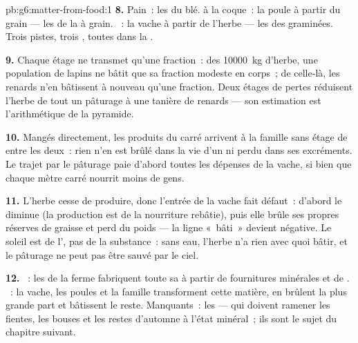 \begin{solution}{pb:g6:matter-from-food:1}
\textbf{8.} Pain~: les  du blé.  à la coque~: la poule à
partir du grain --- les  de la  à grain. ~: la
vache à partir de l'herbe --- les  des graminées. Trois
pistes, trois , toutes dans la .

\textbf{9.} Chaque étage ne transmet qu'une fraction~: des
\qty{10000}{kg} d'herbe, une population de lapins ne bâtit que sa
fraction modeste en corps~; de celle-là, les renards n'en bâtissent
à nouveau qu'une fraction. Deux étages de pertes réduisent
l'herbe de tout un pâturage à une tanière de renards --- son
estimation est l'arithmétique de la pyramide.

\textbf{10.} Mangés directement, les produits du carré arrivent à la
famille sans étage de  entre les deux~: rien n'en est
brûlé dans la vie d'un  ni perdu dans ses excréments. Le
trajet par le pâturage paie d'abord toutes les dépenses de la vache,
si bien que chaque mètre carré nourrit moins de gens.

\textbf{11.} L'herbe cesse de produire, donc l'entrée de la vache
fait défaut~: d'abord le  diminue (la production est de la
nourriture rebâtie), puis elle brûle ses propres réserves de graisse
et perd du poids --- la ligne «~bâti~» devient négative. Le soleil
est de l', pas de la substance~: sans eau, l'herbe n'a rien
avec quoi bâtir, et le pâturage ne peut pas être sauvé par le ciel.

\textbf{12.} ~: les  de la ferme fabriquent toute
sa  à partir de fournitures minérales et de
. ~: la vache, les poules et la famille
transforment cette matière, en brûlent la plus grande part et
bâtissent le reste. Manquants~: les  --- qui doivent
ramener les fientes, les bouses et les restes d'automne à l'état
minéral~; ils sont le sujet du chapitre suivant.
\end{solution}
